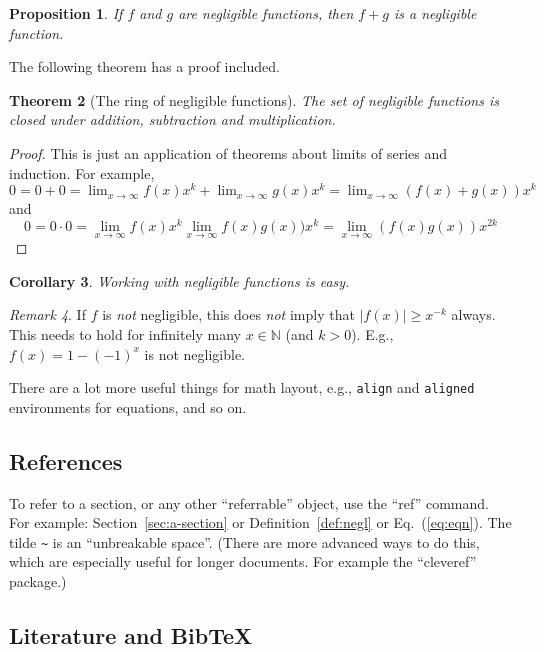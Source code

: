 \documentclass[11pt]{scrartcl}
\theoremstyle{plain} %
\newtheorem{theorem}{Theorem} %
\newtheorem{proposition}[theorem]{Proposition}
\newtheorem{corollary}[theorem]{Corollary}
\theoremstyle{definition} %
\theoremstyle{remark} %
\newtheorem{remark}[theorem]{Remark}
\newcommand{\IN}{\mathbb{N}} %
\begin{document}
\begin{proposition}
	If $f$ and $g$ are negligible functions,
	then $f + g$ is a negligible function.
\end{proposition}

The following theorem has a proof included.

\begin{theorem}[The ring of negligible functions]
	The set of negligible functions is closed under addition, subtraction and multiplication.
\end{theorem}
\begin{proof}
	This is just an application of theorems about limits of series and induction.
	For example, $0 = 0 + 0 = \lim_{x \to \infty} f(x)x^k + \lim_{x \to \infty} g(x)x^k = \lim_{x \to \infty} (f(x) + g(x))x^k$
	and
	\begin{equation*}
		0 = 0 \cdot 0 = \lim_{x \to \infty} f(x) x^{k} \lim_{x \to \infty} f(x) g(x)) x^{k} = \lim_{x \to \infty} (f(x) g(x)) x^{2k}
	\end{equation*}
\end{proof}

\begin{corollary}
	Working with negligible functions is easy.
\end{corollary}

\begin{remark}
	If $f$ is \emph{not} negligible,
	this does \emph{not} imply that $|f(x)| \geq x^{-k}$ always.
	This needs to hold for infinitely many $x \in \IN$ (and $k > 0$).
	E.g., $f(x) = 1 - (-1)^x$ is not negligible.
\end{remark}

There are a lot more useful things for math layout,
e.g., \verb|align| and \verb|aligned| environments for equations, and so on.

\subsection{References}
\label{sec:references}

To refer to a section, or any other ``referrable'' object, use the ``ref'' command.
For example: Section~\ref{sec:a-section} or Definition~\ref{def:negl} or Eq.~(\ref{eq:eqn}).
The tilde \verb|~| is an ``unbreakable space''.
(There are more advanced ways to do this, which are especially useful for longer documents.
For example the ``cleveref'' package.)


\subsection{Literature and BibTeX}
\label{subsec:literature}
\end{document}
